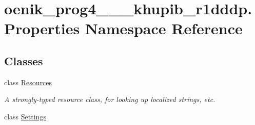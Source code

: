 \hypertarget{namespaceoenik__prog4__2019__1__khupib__r1dddp_1_1_properties}{}\section{oenik\+\_\+prog4\+\_\+\_\+\_\+khupib\+\_\+r1dddp.\+Properties Namespace Reference}
\label{namespaceoenik__prog4__2019__1__khupib__r1dddp_1_1_properties}
\subsection*{Classes}
\begin{DoxyCompactItemize}
\item 
class \mbox{\hyperlink{classoenik__prog4__2019__1__khupib__r1dddp_1_1_properties_1_1_resources}{Resources}}
\begin{DoxyCompactList}\small\item\em A strongly-\/typed resource class, for looking up localized strings, etc. \end{DoxyCompactList}\item 
class \mbox{\hyperlink{classoenik__prog4__2019__1__khupib__r1dddp_1_1_properties_1_1_settings}{Settings}}
\end{DoxyCompactItemize}
